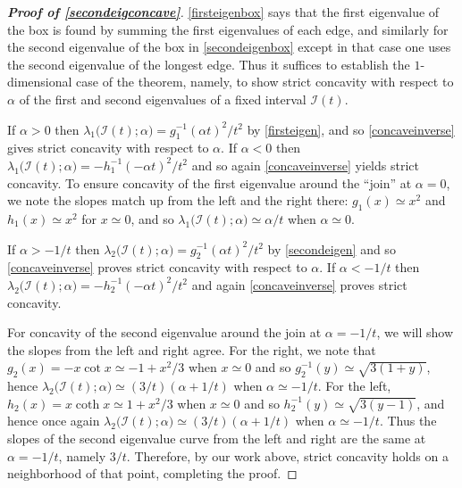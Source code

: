 \documentclass[12pt,reqno]{amsart}
\theoremstyle{definition}
\begin{document}
%
\begin{proof}[\bf Proof of \autoref{secondeigconcave}]
\autoref{firsteigenbox} says that the first eigenvalue of the box is found by summing the first eigenvalues of each edge, and similarly for the second eigenvalue of the box in \autoref{secondeigenbox} except in that case one uses the second eigenvalue of the longest edge. Thus it suffices to establish the $1$-dimensional case of the theorem, namely, to show strict concavity with respect to $\alpha$ of the first and second eigenvalues of a fixed interval $\mathcal{I}(t)$. 

If $\alpha > 0$ then $\lambda_1 \big( \mathcal{I}(t); \alpha \big)
= g_1^{-1}(\alpha t)^2/t^2$ by \autoref{firsteigen}, and so \autoref{concaveinverse} gives strict concavity with respect to $\alpha$. If $\alpha < 0$ then $\lambda_1 \big( \mathcal{I}(t); \alpha \big) = - h_1^{-1}(-\alpha t)^2/t^2$ and so again \autoref{concaveinverse}  yields strict concavity. To ensure concavity of the first eigenvalue around the ``join'' at $\alpha=0$, we note the slopes match up from the left and the right there: $g_1(x) \simeq x^2$ and $h_1(x) \simeq x^2$ for $x \simeq 0$, and so $\lambda_1 \big( \mathcal{I}(t); \alpha \big) \simeq \alpha/t$ when $\alpha \simeq 0$. 

If $\alpha > -1/t$ then $\lambda_2 \big( \mathcal{I}(t); \alpha \big) = g_2^{-1}(\alpha t)^2/t^2$ by \autoref{secondeigen} and so \autoref{concaveinverse} proves strict concavity with respect to $\alpha$. If $\alpha < -1/t$ then $\lambda_2 \big( \mathcal{I}(t); \alpha \big) = - h_2^{-1}(-\alpha t)^2/t^2$ and again \autoref{concaveinverse} proves strict concavity. 

For concavity of the second eigenvalue around the join at $\alpha=-1/t$, we will show the slopes from the left and right agree. For the right, we note that $g_2(x) = -x \cot x \simeq -1+x^2/3$ when $x \simeq 0$ and so $g_2^{-1}(y) \simeq \sqrt{3(1+y)}$, hence $\lambda_2 \big( \mathcal{I}(t); \alpha \big) \simeq (3/t)(\alpha+1/t)$ when $\alpha \simeq -1/t$. For the left, $h_2(x) = x \coth x \simeq 1+x^2/3$ when $x \simeq 0$ and so $h_2^{-1}(y) \simeq \sqrt{3(y-1)}$, and hence once again $\lambda_2 \big( \mathcal{I}(t); \alpha \big) \simeq (3/t)(\alpha+1/t)$ when $\alpha \simeq -1/t$. Thus the slopes of the second eigenvalue curve from the left and right are the same at $\alpha=-1/t$, namely $3/t$. Therefore, by our work above, strict concavity holds on a neighborhood of that point, completing the proof. 
\end{proof}
%
\end{document}
